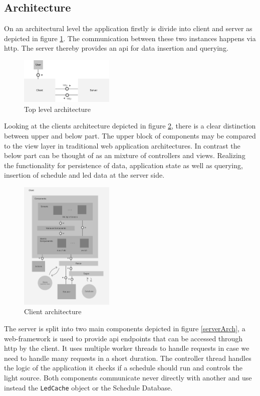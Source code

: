 \documentclass[conference]{IEEEtran}
\begin{document}
\subsection{Architecture}
On an architectural level the application firstly is divide into client and server as depicted in figure \ref{topLevelArch}.
The communication between these two instances happens via http. The server thereby provides an api for data insertion and
querying.

\begin{figure}[H]
   \centering
   \includegraphics[width=0.4\textwidth]{top_level_architecture}
   \caption{Top level architecture}
   \label{topLevelArch}
\end{figure}

Looking at the clients architecture depicted in figure \ref{clientArch}, there is a clear distinction between upper and below
part. The upper block of components may be compared to the view layer in traditional web application architectures. In contrast
the below part can be thought of as an mixture of controllers and views. Realizing the functionality
for persistence of data, application state as well as querying, insertion of schedule and led data at the server side.

\begin{figure}
   \centering
   \includegraphics[width=0.4\textwidth]{client_architecture}
   \caption{Client architecture}
   \label{clientArch}
\end{figure}

The server is split into two main components depicted in figure \ref{serverArch}, a web-framework is used to provide api endpoints that can be accessed through http by
the client. It uses multiple worker threads to handle requests in case we need to handle many requests in a short duration.
The controller thread handles the logic of the application it checks if a schedule should run and controls the light source.
Both components communicate never directly with another and use instead the \texttt{LedCache} object or the Schedule Database.
\end{document}
